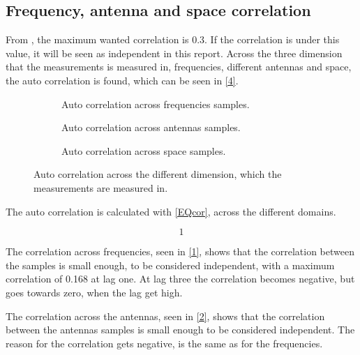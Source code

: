 \subsection{Frequency, antenna and space correlation}
From , the maximum wanted correlation is 0.3. If the correlation is under this value, it will be seen as independent in this report. Across the three dimension that the measurements is measured in, frequencies, different antennas and space, the auto correlation is found, which can be seen in \autoref{4}.

\begin{figure}[H]
\captionsetup{belowskip=0em}
\begin{subfigure}[b]{0.326\textwidth}

\caption{Auto correlation across frequencies samples.}
\label{1}
\end{subfigure}
\begin{subfigure}[b]{0.326\textwidth}

\caption{Auto correlation across antennas samples.}
\label{2}
\end{subfigure}
\begin{subfigure}[b]{0.326\textwidth}

\caption{Auto correlation across space samples.}
\label{3}
\end{subfigure}
\captionsetup{belowskip=-1.5em}
\caption{Auto correlation across the different dimension, which the measurements are measured in.}
\label{4}
\end{figure}

The auto correlation is calculated with \autoref{EQcor}, across the different domains.

\begin{equation}
1
\label{EQcor}
\end{equation}

The correlation across frequencies, seen in \autoref{1}, shows that the correlation between the samples is small enough, to be considered independent, with a maximum correlation of 0.168 at lag one. At lag three the correlation becomes negative, but goes towards zero, when the lag get high. 

The correlation across the antennas, seen in \autoref{2}, shows that the correlation between the antennas samples is small enough to be considered independent. The reason for the correlation gets negative, is the same as for the frequencies.

